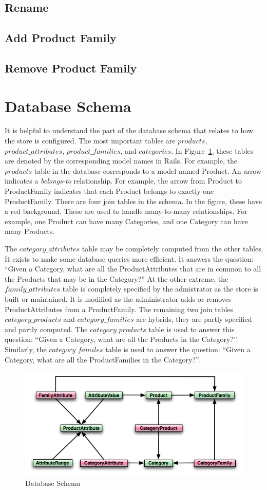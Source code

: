\documentclass[letterpaper, 12pt]{article}
\begin{document}
\subsection{Rename}

\subsection{Add Product Family}

\subsection{Remove Product Family}

\section{Database Schema}
It is helpful to understand the part of the database schema that relates to how the store is configured.  The most important tables are $products$, $product\_attributes$, $product\_families$, and $categories$.  In Figure~\ref{schema02}, these tables are denoted by the corresponding model names in Rails.  For example, the $products$ table in the database corresponds to a model named Product.  An arrow indicates a \emph{belongs-to} relationship.  For example, the arrow from Product to ProductFamily indicates that each Product belongs to exactly one ProductFamily.  There are four join tables in the schema.  In the figure, these have a red background.  These are used to handle many-to-many relationships.  For example, one Product can have many Categories, and one Category can have many Products.  
\par
The $category\_attributes$ table may be completely computed from the other tables.  It exists to make some database queries more efficient.  It answers the question: ``Given a Category, what are all the ProductAttributes that are in common to all the Products that may be in the Category?''  At the other extreme, the $family\_attributes$ table is completely specified by the admistrator as the store is built or maintained.  It is modified as the administrator adds or removes ProductAttributes from a ProductFamily.  The remaining two join tables $category\_products$ and $category\_families$ are hybrids, they are partly specified and partly computed.  The $category\_products$ table is used to answer this question: ``Given a Category, what are all the Products in the Category?''.  Similarly, the $category\_familes$ table is used to answer the question: ``Given a Category, what are all the ProductFamilies in the Category?''.  


\begin{figure}
\includegraphics[scale=0.9]{schema}
\caption{\label{schema02}Database Schema}
\end{figure}


\end{document}
